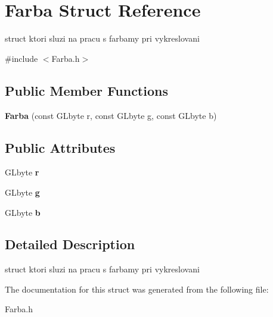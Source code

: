 \hypertarget{struct_farba}{\section{Farba Struct Reference}
\label{struct_farba}
}


struct ktori sluzi na pracu s farbamy pri vykreslovani  




{\ttfamily \#include $<$Farba.\-h$>$}

\subsection*{Public Member Functions}
\begin{DoxyCompactItemize}
\item 
\hypertarget{struct_farba_a5f58214fe6a6962b92e96c667d8c5cbd}{{\bfseries Farba} (const G\-Lbyte r, const G\-Lbyte g, const G\-Lbyte b)}\label{struct_farba_a5f58214fe6a6962b92e96c667d8c5cbd}

\end{DoxyCompactItemize}
\subsection*{Public Attributes}
\begin{DoxyCompactItemize}
\item 
\hypertarget{struct_farba_a8d6af6c200e171f6e77ffd26a870a93e}{G\-Lbyte {\bfseries r}}\label{struct_farba_a8d6af6c200e171f6e77ffd26a870a93e}

\item 
\hypertarget{struct_farba_abb0eaf65fe825f8bc6d8dd4df3757352}{G\-Lbyte {\bfseries g}}\label{struct_farba_abb0eaf65fe825f8bc6d8dd4df3757352}

\item 
\hypertarget{struct_farba_adbd8d5299c2071e336db215ab1dd35d8}{G\-Lbyte {\bfseries b}}\label{struct_farba_adbd8d5299c2071e336db215ab1dd35d8}

\end{DoxyCompactItemize}


\subsection{Detailed Description}
struct ktori sluzi na pracu s farbamy pri vykreslovani 

The documentation for this struct was generated from the following file\-:\begin{DoxyCompactItemize}
\item 
Farba.\-h\end{DoxyCompactItemize}
